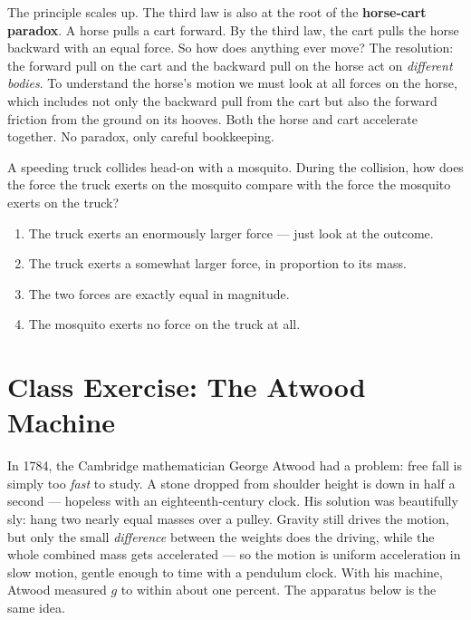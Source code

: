 The principle scales up. The third law is also at the root of the \textbf{horse-cart paradox}.
A horse pulls a cart forward. By the third law, the cart pulls the horse backward with an
equal force. So how does anything ever move? The resolution: the forward pull on the cart
and the backward pull on the horse act on \emph{different bodies}. To understand the horse's
motion we must look at all forces on the horse, which includes not only the backward pull
from the cart but also the forward friction from the ground on its hooves. Both the horse
and cart accelerate together. No paradox, only careful bookkeeping.

\begin{checkpoint}
A speeding truck collides head-on with a mosquito. During the collision,
how does the force the truck exerts on the mosquito compare with the force
the mosquito exerts on the truck?
\begin{enumerate}[label=(\alph*), leftmargin=2.5em, itemsep=0pt]
  \item The truck exerts an enormously larger force --- just look at the outcome.
  \item The truck exerts a somewhat larger force, in proportion to its mass.
  \item The two forces are exactly equal in magnitude.
  \item The mosquito exerts no force on the truck at all.
\end{enumerate}
\end{checkpoint}


\section*{Class Exercise: The Atwood Machine}

In 1784, the Cambridge mathematician George Atwood had a problem: free fall
is simply too \emph{fast} to study. A stone dropped from shoulder height is
down in half a second --- hopeless with an eighteenth-century clock. His
solution was beautifully sly: hang two nearly equal masses over a pulley.
Gravity still drives the motion, but only the small \emph{difference} between
the weights does the driving, while the whole combined mass gets accelerated
--- so the motion is uniform acceleration in slow motion, gentle enough to time
with a pendulum clock. With his machine, Atwood measured $g$ to within about
one percent. The apparatus below is the same idea.

